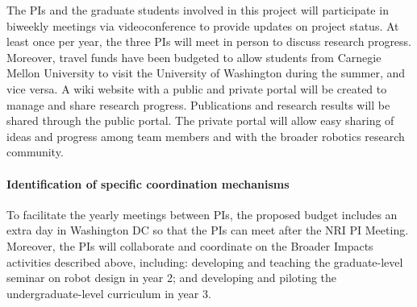 \documentclass[11pt]{article}
\begin{document}
The PIs and the graduate students involved in this project will participate in biweekly meetings via videoconference to provide updates on project status. %
At least once per year, the three PIs will meet in person to discuss research progress. 
Moreover, travel funds have been budgeted to allow students from Carnegie Mellon University to visit the University of Washington during the summer, and vice versa.  
A wiki website with a public and private portal will be created to manage and share research progress. 
Publications and research results will be shared through the public portal. 
The private portal will allow easy sharing of ideas and progress among team members and with the broader robotics research community. 





\paragraph{Identification of specific coordination mechanisms}
To facilitate the yearly meetings between PIs, the proposed budget includes an extra day in Washington DC so that the PIs can meet after the NRI PI Meeting. 
Moreover, the PIs will collaborate and coordinate on the Broader Impacts activities described above, including: 
developing and teaching the graduate-level seminar on robot design in year 2; 
and developing and piloting the undergraduate-level curriculum in year 3.

\pagebreak
\setcounter{page}{1}

\end{document}
